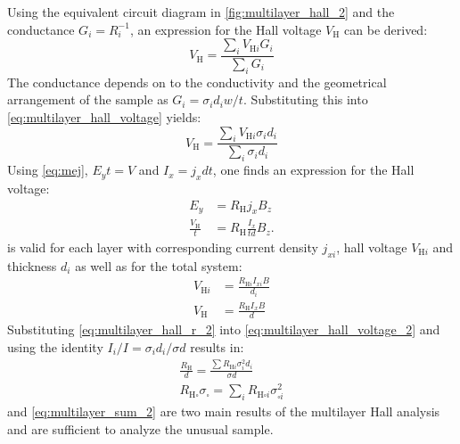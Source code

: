 Using the equivalent circuit diagram in \cref{fig:multilayer_hall_2} and the conductance
$G_i = R_i^{-1}$, an expression for the Hall voltage $V_{\mathrm{H}}$ can be derived:
\begin{equation}
	V_{\mathrm{H}}=\frac{\sum_{i}V_{\mathrm{H}i}G_{i}}{\sum_{i}G_{i}}
	\label{eq:multilayer_hall_voltage}
\end{equation}
The conductance depends on to the conductivity and the geometrical arrangement of the 
sample as $G_i = \sigma_i d_i w/ t$. Substituting this into 
\cref{eq:multilayer_hall_voltage} yields:
\begin{equation}
	V_{\mathrm{H}}=\frac{\sum_{i}V_{\mathrm{H}i}  
	\sigma_{i}d_{i}}{\sum_{i} \sigma_{i}d_{i}}
	\label{eq:multilayer_hall_voltage_2}
\end{equation}
Using \cref{eq:mej}, $E_y t = V$ and $I_x=j_x d t$, one finds an expression 
for the Hall voltage:
\begin{align}
	E_{y}&=R_{\mathrm{H}}j_{x}B_{z} \\
	\frac{V_{\mathrm{H}}}{t}&=R_{\mathrm{H}}\frac{I_{x}}{t d}B_{z}.
	\label{eq:multilayer_hall_r}
\end{align}
 is valid for each layer with corresponding current density
$j_{xi}$, hall voltage $V_{\mathrm{H}i}$ and thickness $d_i$ as well as for the total 
system:
\begin{align}
	V_{\mathrm{H}i} &= \frac{R_{\mathrm{H}i}I_{xi} B}{d_{i}} \\
	V_{\mathrm{H}}&=\frac{R_{\mathrm{H}}I_{x}B}{d}
	\label{eq:multilayer_hall_r_2}
\end{align}
Substituting \cref{eq:multilayer_hall_r_2} into \cref{eq:multilayer_hall_voltage_2} and
using the identity $I_{i} /I=\sigma_{i}d_{i} /\sigma d$ results in:
\begin{align}
	\frac{R_{\mathrm{H}}}{d}=\frac{\sum R_{\mathrm{H}i} \sigma_{i}^{2} d_{i}}{\sigma d} \\
	R_{\mathrm{H \square}}\sigma_{\square}=\sum_{i}R_{\mathrm{H}\square i} 
	\sigma_{\square i}^{2}
	\label{eq:multilayer_sum_2}
\end{align}
 and \cref{eq:multilayer_sum_2} are two main results of the 
multilayer Hall analysis and are sufficient to analyze the unusual  sample.